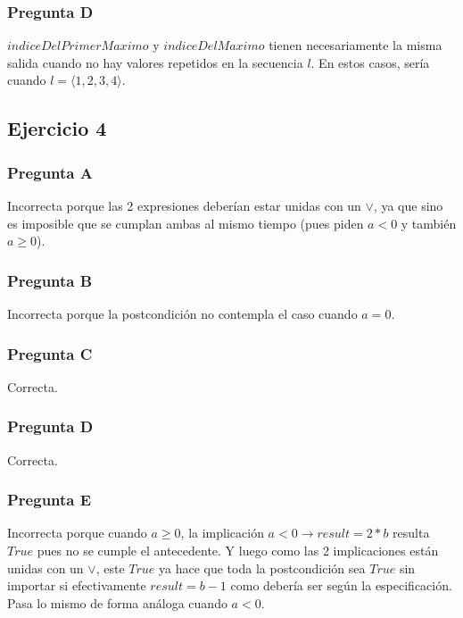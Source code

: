\subsubsection{Pregunta D}

$indiceDelPrimerMaximo$ y $indiceDelMaximo$ tienen necesariamente la misma salida cuando no hay valores repetidos en la secuencia $l$. En estos casos, sería cuando $l = \langle 1, 2, 3, 4 \rangle$.

\subsection{Ejercicio 4}

\subsubsection{Pregunta A}

Incorrecta porque las 2 expresiones deberían estar unidas con un $\lor$, ya que sino es imposible que se cumplan ambas al mismo tiempo (pues piden $a < 0$ y también $a \geq 0$).

\subsubsection{Pregunta B}

Incorrecta porque la postcondición no contempla el caso cuando $a = 0$.

\subsubsection{Pregunta C}

Correcta.

\subsubsection{Pregunta D}

Correcta.

\subsubsection{Pregunta E}

Incorrecta porque cuando $a \geq 0$, la implicación $a < 0 \rightarrow result = 2 * b$ resulta $True$ pues no se cumple el antecedente. Y luego como las 2 implicaciones están unidas con un $\lor$, este $True$ ya hace que toda la postcondición sea $True$ sin importar si efectivamente $result = b - 1$ como debería ser según la especificación. Pasa lo mismo de forma análoga cuando $a < 0$.

